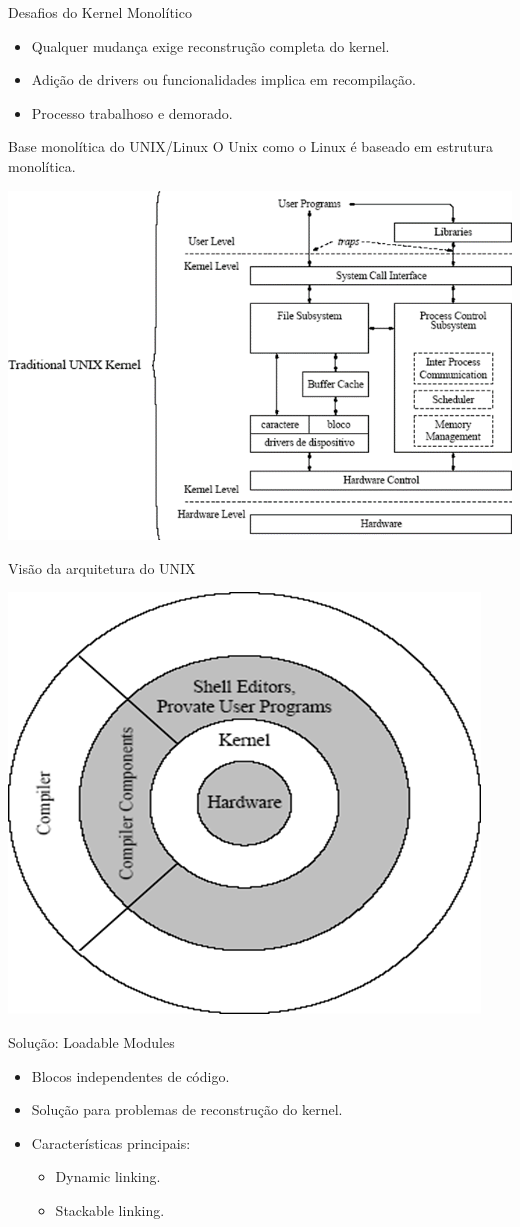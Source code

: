 \documentclass{beamer}
\begin{document}
\begin{frame}{Desafios do Kernel Monolítico}
    \begin{itemize}
        \item Qualquer mudança exige reconstrução completa do kernel.
        \item Adição de drivers ou funcionalidades implica em recompilação.
        \item Processo trabalhoso e demorado.
    \end{itemize}
\end{frame}
\begin{frame}{Base monolítica do UNIX/Linux}
    O Unix como o Linux é baseado em estrutura monolítica.
    
    \begin{center}
        \includegraphics[width=0.6\linewidth]{assets/aula-tads-sope/SO-unix-linux-2.png}
    \end{center}
\end{frame}
\begin{frame}{Visão da arquitetura do UNIX}
    
    \begin{center}
        \includegraphics[width=0.45\linewidth]{assets/aula-tads-sope/SO-unix-linux-3.png}
    \end{center}
\end{frame}
\begin{frame}{Solução: Loadable Modules}
    \begin{itemize}
        \item Blocos independentes de código.
        \item Solução para problemas de reconstrução do kernel.
        \item Características principais:
            \begin{itemize}
                \item Dynamic linking.
                \item Stackable linking.
            \end{itemize}
    \end{itemize}
\end{frame}
\end{document}
